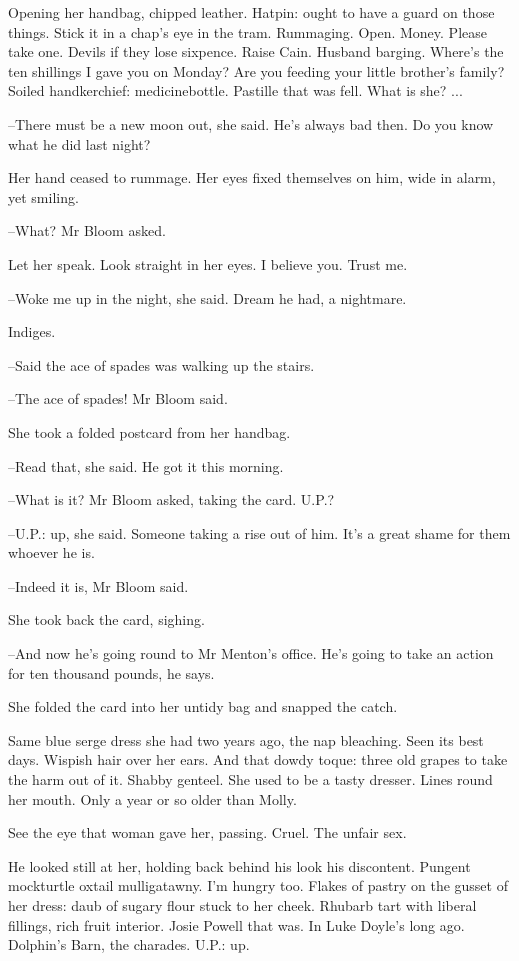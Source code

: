 Opening her handbag, chipped leather.
Hatpin:
ought to have a guard on those things.
Stick it in a chap's eye in the tram.
Rummaging.
Open.
Money.
Please take one.
Devils if they lose sixpence.
Raise Cain.
Husband barging.
Where's the ten shillings I gave you on Monday?
Are you feeding your little brother's family?
Soiled handkerchief:
medicinebottle.
Pastille that was fell.
What is she?
...

--There must be a new moon out,
she said.
He's always bad then.
Do you know what he did last night?

Her hand ceased to rummage.
Her eyes fixed themselves on him,
wide in alarm,
yet smiling.

--What?
Mr Bloom asked.

Let her speak.
Look straight in her eyes.
I believe you.
Trust me.

--Woke me up in the night,
she said.
Dream he had,
a nightmare.

Indiges.

--Said the ace of spades was walking up the stairs.

--The ace of spades!
Mr Bloom said.

She took a folded postcard from her handbag.

--Read that,
she said.
He got it this morning.

--What is it?
Mr Bloom asked,
taking the card.
U.P.?

--U.P.: up,
she said.
Someone taking a rise out of him.
It's a great shame
for them whoever he is.

--Indeed it is,
Mr Bloom said.

She took back the card,
sighing.

--And now he's going round to Mr Menton's office.
He's going to take an action for ten thousand pounds,
he says.

She folded the card into her untidy bag and snapped the catch.

Same blue serge dress she had two years ago,
the nap bleaching.
Seen its best days.
Wispish hair over her ears.
And that dowdy toque:
three old grapes to take the harm out of it.
Shabby genteel.
She used to be a tasty dresser.
Lines round her mouth.
Only a year or so older than Molly.

See the eye that woman gave her,
passing.
Cruel.
The unfair sex.

He looked still at her,
holding back behind his look his discontent.
Pungent mockturtle oxtail mulligatawny.
I'm hungry too.
Flakes of pastry on the gusset of her dress:
daub of sugary flour stuck to her cheek.
Rhubarb tart with liberal fillings,
rich fruit interior.
Josie Powell that was.
In Luke Doyle's long ago.
Dolphin's Barn,
the charades.
U.P.:
up.


